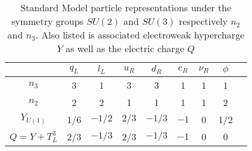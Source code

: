\begin{center}
\begin{table}[]
\begin{center}
\caption{Standard Model particle representations under the symmetry groups $SU(2)$ and $SU(3)$ respectively $n_2$ and $n_3$. Also listed is associated electroweak hypercharge $Y$ as well as the electric charge $Q$ }
\begin{tabular}{ccccccccc}
                & $q_L$ & $l_L$  & $u_R$ & $d_R$  & $e_R$ & $\nu_R$ & $\phi$ \\
\hline
$n_3$           & 3     & 1      & 3     & 3      & 1     & 1  & 1     \\
$n_2$           & 2     & 2      & 1     & 1      & 1     & 1  & 2     \\
$Y_{U(1)}$      & 1/6   & $-1/2$ & $2/3$ & $-1/3$ & $-1$  & 0  & 1/2     \\
\hline
\hline
$Q = Y + T_L^3$ & 2/3   & $-1/3$ & 2/3   & $-1/3$ & $-1$  & 0 & 0
\end{tabular}
\end{center}
\label{tab:reps} 
\end{table}
\end{center}
